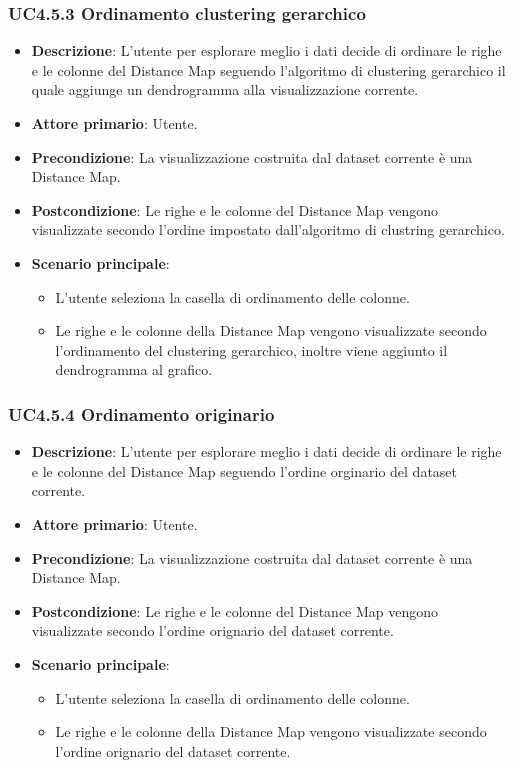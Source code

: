 \subsubsection{UC4.5.3 Ordinamento clustering gerarchico}
\label{ssub:uc4.5.3}
\begin{itemize}
    \item \textbf{Descrizione}: L'utente per esplorare meglio i dati decide di ordinare le righe e le colonne del Distance Map seguendo l'algoritmo di clustering gerarchico il quale aggiunge un dendrogramma alla visualizzazione corrente.
    \item \textbf{Attore primario}: Utente.
    \item \textbf{Precondizione}: La visualizzazione costruita dal dataset corrente è una Distance Map.
    \item \textbf{Postcondizione}: Le righe e le colonne del Distance Map vengono visualizzate secondo l'ordine impostato dall'algoritmo di clustring gerarchico.
    \item \textbf{Scenario principale}: 
    \begin{itemize}
        \item L'utente seleziona la casella di ordinamento delle colonne.
        \item Le righe e le colonne della Distance Map vengono visualizzate secondo l'ordinamento del clustering gerarchico, inoltre viene aggiunto il dendrogramma al grafico.
    \end{itemize}
\end{itemize}

\subsubsection{UC4.5.4 Ordinamento originario}
\label{ssub:uc4.5.4}
\begin{itemize}
    \item \textbf{Descrizione}: L'utente per esplorare meglio i dati decide di ordinare le righe e le colonne del Distance Map seguendo l'ordine orginario del dataset corrente.
    \item \textbf{Attore primario}: Utente.
    \item \textbf{Precondizione}: La visualizzazione costruita dal dataset corrente è una Distance Map.
    \item \textbf{Postcondizione}: Le righe e le colonne del Distance Map vengono visualizzate secondo l'ordine orignario del dataset corrente.
    \item \textbf{Scenario principale}: 
    \begin{itemize}
        \item L'utente seleziona la casella di ordinamento delle colonne.
        \item Le righe e le colonne della Distance Map vengono visualizzate secondo l'ordine orignario del dataset corrente.
    \end{itemize}
\end{itemize}

